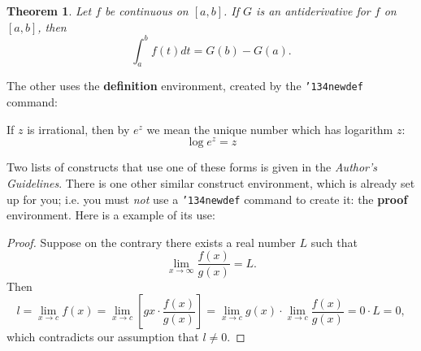 \documentclass{sig-alternate-05-2015}
\begin{document}
\newtheorem{theorem}{Theorem}
\begin{theorem}
	Let $f$ be continuous on $[a,b]$.  If $G$ is an antiderivative for $f$ on $[a,b]$, then
	\begin{displaymath}
		\int^b_af(t)dt = G(b) - G(a).
	\end{displaymath}
\end{theorem}

The other uses the \textbf{definition} environment, created by the \texttt{{\char'134}newdef} command: 

\begin{definition}
	If $z$ is irrational, then by $e^z$ we mean the unique number which has logarithm $z$:
	\begin{displaymath}{\log e^z = z}\end{displaymath}
\end{definition}

Two lists of constructs that use one of these forms is given in the \textit{Author's  Guidelines}. There is one other similar construct environment, which is already set up for you; i.e. you must \textit{not} use a \texttt{{\char'134}newdef} command to create it: the \textbf{proof} environment.  Here is a example of its use:

\begin{proof}
	Suppose on the contrary there exists a real number $L$ such that
	\begin{displaymath}
		\lim_{x\rightarrow\infty} \frac{f(x)}{g(x)} = L.
	\end{displaymath}
	Then
	\begin{displaymath}
		l=\lim_{x\rightarrow c} f(x)
		= \lim_{x\rightarrow c}
		\left[ g{x} \cdot \frac{f(x)}{g(x)} \right ]
		= \lim_{x\rightarrow c} g(x) \cdot \lim_{x\rightarrow c}
		\frac{f(x)}{g(x)} = 0\cdot L = 0,
	\end{displaymath}
	which contradicts our assumption that $l\neq 0$.
\end{proof}




\end{document}
